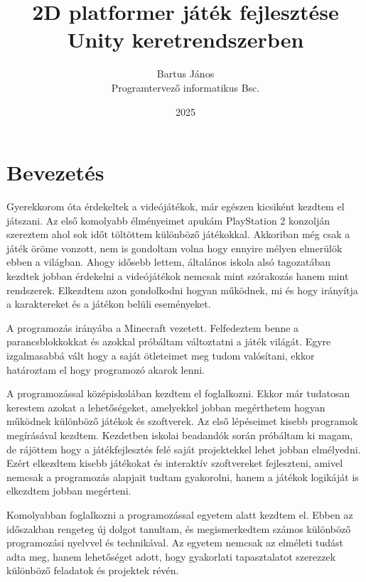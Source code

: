 \documentclass[
]{thesis-ekf}
\theoremstyle{definition}
\theoremstyle{remark}
\begin{document}
\title{2D platformer játék fejlesztése Unity keretrendszerben}
\author{Bartus János\\Programtervező informatikus Bsc.}
\date{2025}
\maketitle

\tableofcontents

\chapter*{Bevezetés}
Gyerekkorom óta érdekeltek a videójátékok, már egészen kicsiként kezdtem el játszani. Az első komolyabb élményeimet apukám PlayStation 2 konzolján szereztem ahol sok időt töltöttem különböző játékokkal. Akkoriban még csak a játék öröme vonzott, nem is gondoltam volna hogy ennyire mélyen elmerülök ebben a világban.
Ahogy idősebb lettem, általános iskola alsó tagozatában kezdtek jobban érdekelni a videójátékok nemcsak mint szórakozás hanem mint rendszerek. Elkezdtem azon gondolkodni hogyan működnek, mi és hogy irányítja a karaktereket és a játékon belüli eseményeket.
 
A programozás irányába a Minecraft vezetett. Felfedeztem benne a parancsblokkokkat és azokkal próbáltam változtatni a játék világát. Egyre izgalmasabbá vált hogy a saját ötleteimet meg tudom valósítani, ekkor határoztam el hogy programozó akarok lenni.

A programozással középiskolában kezdtem el foglalkozni. Ekkor már tudatosan kerestem azokat a lehetőségeket, amelyekkel jobban megérthetem hogyan működnek különböző játékok és szoftverek. Az első lépéseimet kisebb programok megírásával kezdtem. Kezdetben iskolai beadandók során próbáltam ki magam, de rájöttem hogy a játékfejlesztés felé saját projektekkel lehet jobban elmélyedni. Ezért elkezdtem kisebb játékokat és interaktív szoftvereket fejleszteni, amivel nemcsak a programozás alapjait tudtam gyakorolni, hanem a játékok logikáját is elkezdtem jobban megérteni.

Komolyabban foglalkozni a programozással egyetem alatt kezdtem el. Ebben az időszakban rengeteg új dolgot tanultam, és megismerkedtem számos különböző programozási nyelvvel és technikával. Az egyetem nemcsak az elméleti tudást adta meg, hanem lehetőséget adott, hogy gyakorlati tapasztalatot szerezzek különböző feladatok és projektek révén.
\end{document}
